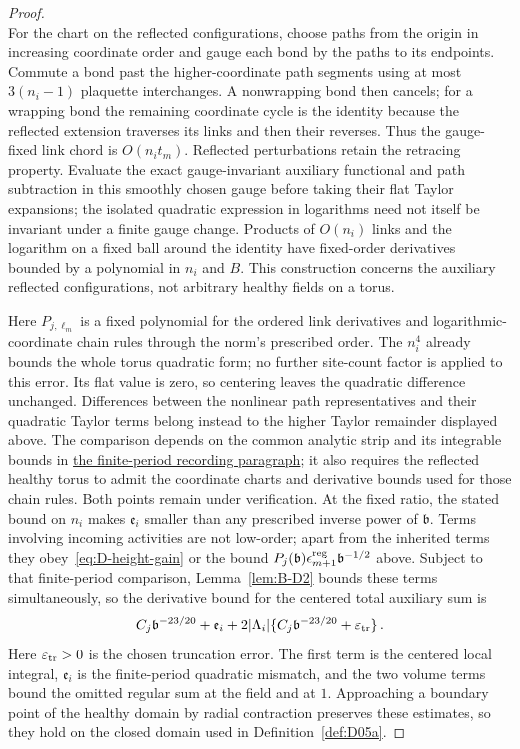 \begin{proof}
\begin{equation*}
\end{equation*}
For the chart on the reflected configurations, choose paths from the origin in increasing coordinate order and gauge each bond by the paths to its endpoints. Commute a bond past the higher-coordinate path segments using at most $3(n_i-1)$ plaquette interchanges. A nonwrapping bond then cancels; for a wrapping bond the remaining coordinate cycle is the identity because the reflected extension traverses its links and then their reverses. Thus the gauge-fixed link chord is $O(n_it_m)$. Reflected perturbations retain the retracing property. Evaluate the exact gauge-invariant auxiliary functional and path subtraction in this smoothly chosen gauge before taking their flat Taylor expansions; the isolated quadratic expression in logarithms need not itself be invariant under a finite gauge change. Products of $O(n_i)$ links and the logarithm on a fixed ball around the identity have fixed-order derivatives bounded by a polynomial in $n_i$ and $B$. This construction concerns the auxiliary reflected configurations, not arbitrary healthy fields on a torus.

Here $P_{j,\ell_m}$ is a fixed polynomial for the ordered link derivatives and logarithmic-coordinate chain rules through the norm's prescribed order. The $n_i^4$ already bounds the whole torus quadratic form; no further site-count factor is applied to this error. Its flat value is zero, so centering leaves the quadratic difference unchanged. Differences between the nonlinear path representatives and their quadratic Taylor terms belong instead to the higher Taylor remainder displayed above. The comparison depends on the common analytic strip and its integrable bounds in \hyperref[par:C-finite-period]{the finite-period recording paragraph}; it also requires the reflected healthy torus to admit the coordinate charts and derivative bounds used for those chain rules. Both points remain under verification. At the fixed ratio, the stated bound on $n_i$ makes $\mathfrak e_i$ smaller than any prescribed inverse power of $\mathfrak b$. Terms involving incoming activities are not low-order; apart from the inherited terms they obey~\eqref{eq:D-height-gain} or the bound $P_j(\mathfrak b)\epsilon_{m+1}^{\rm reg}\mathfrak b^{-1/2}$ above. Subject to that finite-period comparison, Lemma~\ref{lem:B-D2} bounds these terms simultaneously, so the derivative bound for the centered total auxiliary sum is
\begin{equation}\label{eq:D-aux-bound}
C_j \mathfrak b^{-23/20}+\mathfrak e_i+2|\Lambda_i|\{C_j \mathfrak b^{-23/20}+\varepsilon_{\rm tr}\}\,.
\end{equation}
Here $\varepsilon_{\rm tr}>0$ is the chosen truncation error. The first term is the centered local integral, $\mathfrak e_i$ is the finite-period quadratic mismatch, and the two volume terms bound the omitted regular sum at the field and at $1$. Approaching a boundary point of the healthy domain by radial contraction preserves these estimates, so they hold on the closed domain used in Definition~\ref{def:D05a}.


\end{proof}
